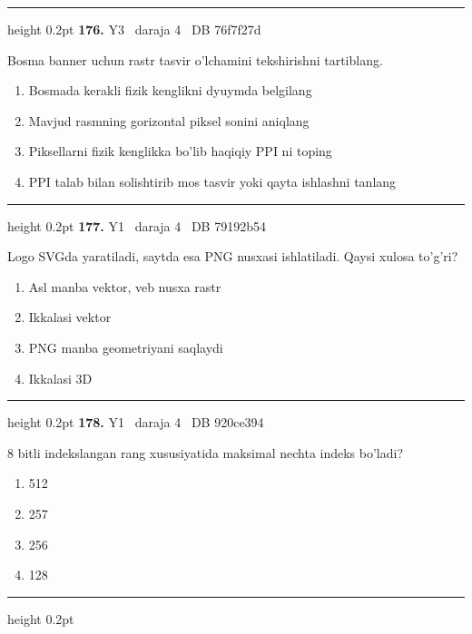 \documentclass[10pt,a4paper,oneside]{article}
\begin{document}
\vspace{2mm}\hrule height 0.2pt \vspace{4mm}
\hypertarget{q176}{\textbf{\color{ink}176.}}  {\color{muted}\scriptsize Y3 \textbullet\ daraja 4 \textbullet\ DB 76f7f27d}
\par
Bosma banner uchun rastr tasvir o'lchamini tekshirishni tartiblang.
\begin{enumerate}[label=\Alph*),leftmargin=9mm]
\item Bosmada kerakli fizik kenglikni dyuymda belgilang
\item Mavjud rasmning gorizontal piksel sonini aniqlang
\item Piksellarni fizik kenglikka bo'lib haqiqiy PPI ni toping
\item PPI talab bilan solishtirib mos tasvir yoki qayta ishlashni tanlang
\end{enumerate}
\vspace{2mm}\hrule height 0.2pt \vspace{4mm}
\hypertarget{q177}{\textbf{\color{ink}177.}}  {\color{muted}\scriptsize Y1 \textbullet\ daraja 4 \textbullet\ DB 79192b54}
\par
Logo SVGda yaratiladi, saytda esa PNG nusxasi ishlatiladi. Qaysi xulosa to'g'ri?
\begin{enumerate}[label=\Alph*),leftmargin=9mm]
\item Asl manba vektor, veb nusxa rastr
\item Ikkalasi vektor
\item PNG manba geometriyani saqlaydi
\item Ikkalasi 3D
\end{enumerate}
\vspace{2mm}\hrule height 0.2pt \vspace{4mm}
\hypertarget{q178}{\textbf{\color{ink}178.}}  {\color{muted}\scriptsize Y1 \textbullet\ daraja 4 \textbullet\ DB 920ce394}
\par
8 bitli indekslangan rang xususiyatida maksimal nechta indeks bo'ladi?
\begin{enumerate}[label=\Alph*),leftmargin=9mm]
\item 512
\item 257
\item 256
\item 128
\end{enumerate}
\vspace{2mm}\hrule height 0.2pt \vspace{4mm}
\end{document}
